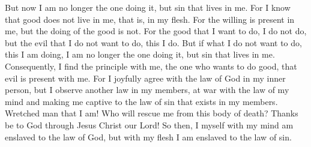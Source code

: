 \begin{biblechapter}
\verse But now I am no longer the one doing it, but sin that lives in me.
\verse For I know that good does not live in me, that is, in my flesh. For the willing is present in me, but the doing of the good is not.
\verse For the good that I want to do, I do not do, but the evil that I do not want to do, this I do.
\verse But if what I do not want to do, this I am doing, I am no longer the one doing it, but sin that lives in me.
\verse Consequently, I find the principle with me, the one who wants to do good, that evil is present with me.
\verse For I joyfully agree with the law of God in my inner person,
\verse but I observe another law in my members, at war with the law of my mind and making me captive to the law of sin that exists in my members.
\verse Wretched man that I am! Who will rescue me from this body of death?
\verse Thanks be to God through Jesus Christ our Lord! So then, I myself with my mind am enslaved to the law of God, but with my flesh I am enslaved to the law of sin.
\end{biblechapter}

